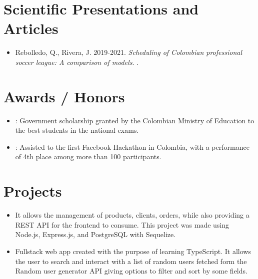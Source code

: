 \documentclass[]{rahulworld-resume}
\begin{document}
\begin{minipage}[t]{0.66\textwidth}
\section{Scientific Presentations and Articles}

\noindent
\begin{itemize}
    \item Rebolledo, Q., Rivera, J. 2019-2021. \textit{Scheduling of Colombian professional soccer league: A comparison of models}. \href{https://github.com/jamerrq/20192-Sport-Scheduling}{}.
\end{itemize}


\section{Awards / Honors}

\begin{itemize}
    \item {}: Government scholarship granted by the
    Colombian Ministry of Education to the best students in
    the national exams.
    \item {}: Assisted to the first Facebook Hackathon in Colombia,
    with a performance of 4th place among more than 100 participants.
\end{itemize}

\section{Projects}

\begin{itemize}
    \item \href{https://github.com/PF-Ide-Pintureria/pinturas-app-back}{} It allows the management of products, clients, orders, while also providing a REST API for the frontend to consume. This project was made using Node.js, Express.js, and PostgreSQL with Sequelize.

    \item \href{https://github.com/jamerrq/wks-typescript}{} Fullstack web app created with the purpose of learning TypeScript. It allows the user to search and interact with a list of random users fetched form the Random user generator API giving options to filter and sort by some fields.


\end{itemize}
\end{minipage}
\end{document}
